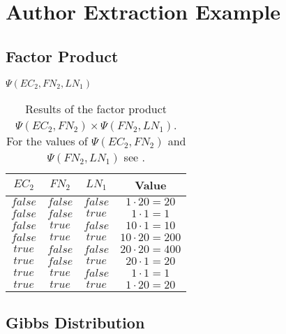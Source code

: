 \chapter{Author Extraction Example}\label{app:cha-author-extraction-example}
\section{Factor Product}\label{app:sec-factor-product}
\begin{table}[h!]
\centering
$\Psi(EC_2,FN_2,LN_1)$\par
\smallskip
\begin{tabular}{c c c c}
 \toprule
 $EC_2$ & $FN_2$ & $LN_1$ & Value \\
 \midrule
 $false$ & $false$ & $false$ & $1\cdot20=20$ \\
 $false$ & $false$ & $true$  & $1\cdot1=1$ \\
 $false$ & $true$  & $false$ & $10\cdot1=10$ \\
 $false$ & $true$  & $true$  & $10\cdot20=200$ \\
 $true$  & $false$ & $false$ & $20\cdot20=400$ \\
 $true$  & $false$ & $true$  & $20\cdot1=20$ \\
 $true$  & $true$  & $false$ & $1\cdot1=1$ \\
 $true$  & $true$  & $true$  & $1\cdot20=20$ \\
 \bottomrule
\end{tabular}
\caption{Results of the \gls{factor product} $\Psi(EC_2,FN_2)\times\Psi(FN_2,LN_1)$. For the values of $\Psi(EC_2,FN_2)$ and $\Psi(FN_2,LN_1)$ see .}
\label{tab:example-factor-product}
\end{table}
\section{Gibbs Distribution}\label{app:sec-gibbs-distribution}
